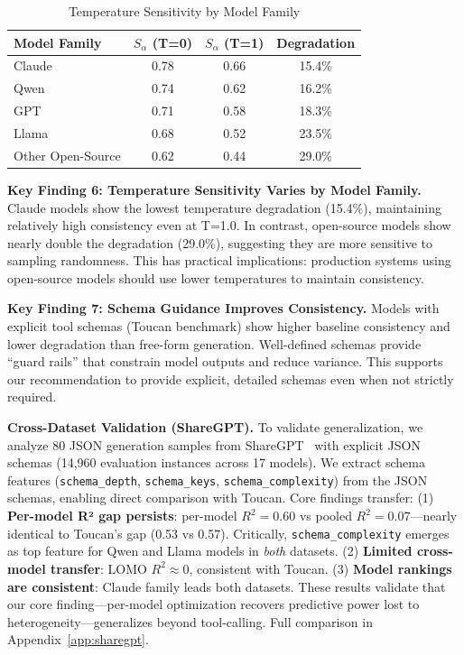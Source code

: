 \documentclass[sigconf,anonymous,review]{acmart}
\begin{document}
\begin{table}[t]
\centering
\caption{Temperature Sensitivity by Model Family}
\label{tab:temp_sensitivity}
\small
\begin{tabular}{@{}lccc@{}}
\toprule
\textbf{Model Family} & \textbf{$S_\alpha$ (T=0)} & \textbf{$S_\alpha$ (T=1)} & \textbf{Degradation} \\
\midrule
Claude & 0.78 & 0.66 & 15.4\% \\
Qwen & 0.74 & 0.62 & 16.2\% \\
GPT & 0.71 & 0.58 & 18.3\% \\
Llama & 0.68 & 0.52 & 23.5\% \\
Other Open-Source & 0.62 & 0.44 & 29.0\% \\
\bottomrule
\end{tabular}
\end{table}

\textbf{Key Finding 6: Temperature Sensitivity Varies by Model Family.} Claude models show the lowest temperature degradation (15.4\%), maintaining relatively high consistency even at T=1.0. In contrast, open-source models show nearly double the degradation (29.0\%), suggesting they are more sensitive to sampling randomness. This has practical implications: production systems using open-source models should use lower temperatures to maintain consistency.

\textbf{Key Finding 7: Schema Guidance Improves Consistency.} Models with explicit tool schemas (Toucan benchmark) show higher baseline consistency and lower degradation than free-form generation. Well-defined schemas provide ``guard rails'' that constrain model outputs and reduce variance. This supports our recommendation to provide explicit, detailed schemas even when not strictly required.

\textbf{Cross-Dataset Validation (ShareGPT).} To validate generalization, we analyze 80 JSON generation samples from ShareGPT~\cite{sharegpt2023} with explicit JSON schemas (14,960 evaluation instances across 17 models). We extract schema features (\texttt{schema\_depth}, \texttt{schema\_keys}, \texttt{schema\_complexity}) from the JSON schemas, enabling direct comparison with Toucan. Core findings transfer: (1) \textbf{Per-model R² gap persists}: per-model $R^2=0.60$ vs pooled $R^2=0.07$---nearly identical to Toucan's gap (0.53 vs 0.57). Critically, \texttt{schema\_complexity} emerges as top feature for Qwen and Llama models in \textit{both} datasets. (2) \textbf{Limited cross-model transfer}: LOMO $R^2 \approx 0$, consistent with Toucan. (3) \textbf{Model rankings are consistent}: Claude family leads both datasets. These results validate that our core finding---per-model optimization recovers predictive power lost to heterogeneity---generalizes beyond tool-calling. Full comparison in Appendix~\ref{app:sharegpt}.
\end{document}

